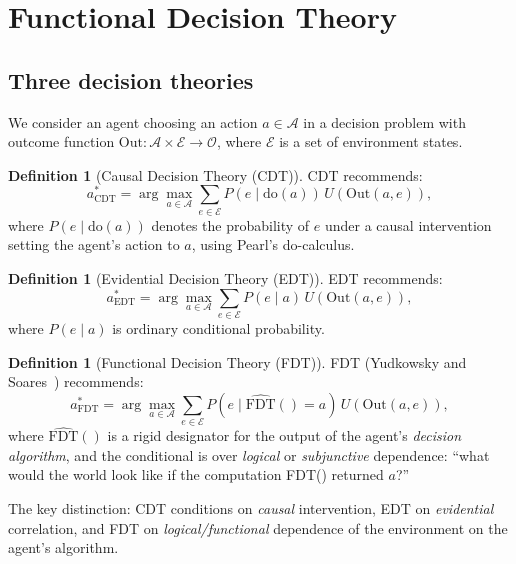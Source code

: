 \documentclass[11pt,a4paper]{article}
\theoremstyle{definition}
\newtheorem{definition}[theorem]{Definition}
\theoremstyle{remark}
\newcommand{\Do}{\mathrm{do}}
\begin{document}
\section{Functional Decision Theory}\label{sec:fdt}

\subsection{Three decision theories}

We consider an agent choosing an action $a \in \mathcal{A}$ in a
decision problem with outcome function
$\text{Out}: \mathcal{A} \times \mathcal{E} \to \mathcal{O}$, where
$\mathcal{E}$ is a set of environment states.

\begin{definition}[Causal Decision Theory (CDT)]
CDT recommends:
\[
  a^*_{\text{CDT}} = \arg\max_{a \in \mathcal{A}} \sum_{e \in \mathcal{E}}
    P(e \mid \Do(a))\, U(\text{Out}(a, e)),
\]
where $P(e \mid \Do(a))$ denotes the probability of $e$ under a causal
intervention setting the agent's action to $a$, using Pearl's
do-calculus.
\end{definition}

\begin{definition}[Evidential Decision Theory (EDT)]
EDT recommends:
\[
  a^*_{\text{EDT}} = \arg\max_{a \in \mathcal{A}} \sum_{e \in \mathcal{E}}
    P(e \mid a)\, U(\text{Out}(a, e)),
\]
where $P(e \mid a)$ is ordinary conditional probability.
\end{definition}

\begin{definition}[Functional Decision Theory (FDT)]
FDT (Yudkowsky and Soares~\cite{soares2018fdt}) recommends:
\[
  a^*_{\text{FDT}} = \arg\max_{a \in \mathcal{A}} \sum_{e \in \mathcal{E}}
    P(e \mid \widehat{\text{FDT}}() = a)\, U(\text{Out}(a, e)),
\]
where $\widehat{\text{FDT}}()$ is a rigid designator for the output of
the agent's \emph{decision algorithm}, and the conditional is over
\emph{logical} or \emph{subjunctive} dependence: ``what would the world
look like if the computation FDT() returned $a$?''
\end{definition}

The key distinction: CDT conditions on \emph{causal} intervention, EDT
on \emph{evidential} correlation, and FDT on \emph{logical/functional}
dependence of the environment on the agent's algorithm.
\end{document}
